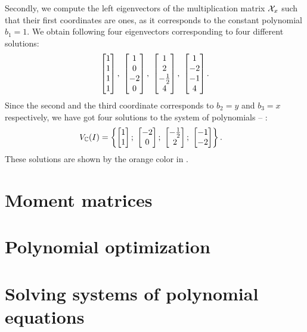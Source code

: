\begin{example}
  Secondly, we compute the left eigenvectors of the multiplication matrix $\mathcal{X}_x$ such that their first coordinates are ones, as it corresponds to the constant polynomial $b_1 = 1$.
  We obtain following four eigenvectors corresponding to four different solutions:
  \begin{align}
    \begin{bmatrix} 1\\ 1\\ 1\\ 1 \end{bmatrix},\
    \begin{bmatrix} 1\\ 0\\ -2\\ 0 \end{bmatrix},\
    \begin{bmatrix} 1\\ 2\\ -\frac{1}{2}\\ 4 \end{bmatrix},\
    \begin{bmatrix} 1\\ -2\\ -1\\ 4 \end{bmatrix}.
  \end{align}
  Since the second and the third coordinate corresponds to $b_2 = y$ and $b_3 = x$ respectively, we have got four solutions to the system of polynomials  -- :
  \begin{align}
    V_{\mathbb{C}}(I) &= \left\{
        \begin{bmatrix} 1\\ 1 \end{bmatrix};\
        \begin{bmatrix} -2\\ 0 \end{bmatrix};\
        \begin{bmatrix} -\frac{1}{2}\\ 2 \end{bmatrix};\
        \begin{bmatrix} -1\\ -2 \end{bmatrix}
      \right\}.
  \end{align}
  These solutions are shown by the orange color in .
\end{example}

\section{Moment matrices}

\section{Polynomial optimization}

\section{Solving systems of polynomial equations}
